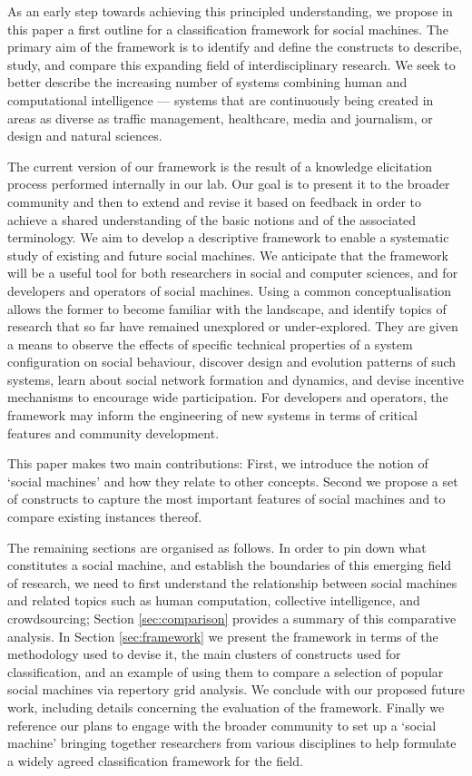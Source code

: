 \documentclass{www13-companion-accepted}
\begin{document}
As an early step towards achieving this principled understanding, we propose in this paper a first outline for a classification framework for social machines. The primary aim of the framework is to identify and define the constructs to describe, study, and compare this expanding field of interdisciplinary research. We seek to better describe the increasing number of systems combining human and computational intelligence --- systems that are continuously being created in areas as diverse as traffic management, healthcare, media and journalism, or design and natural sciences.

The current version of our framework is the result of a knowledge elicitation process performed internally in our lab. Our goal is to present it to the broader community and then to extend and revise it based on feedback in order to achieve a shared understanding of the basic notions and of the associated terminology. We aim to develop a descriptive framework to enable a systematic study of existing and future social machines. We anticipate that the framework will be a useful tool for both researchers in social and computer sciences, and for developers and operators of social machines. Using a common conceptualisation allows the former to become familiar with the landscape, and identify topics of research that so far have remained unexplored or under-explored. They are given a means to observe the effects of specific technical properties of a system configuration on social behaviour, discover design and evolution patterns of such systems, learn about social network formation and dynamics, and devise incentive mechanisms to encourage wide participation. For developers and operators, the framework may inform the engineering of new systems in terms of critical features and community development.

This paper makes two main contributions: First, we introduce the notion of `social machines' and how they relate to other concepts. Second we propose a set of constructs to capture the most important features of social machines and to compare existing instances thereof.

The remaining sections are organised as follows. In order to pin down what constitutes a social machine, and establish the boundaries of this emerging field of research, we need to first understand the relationship between social machines and related topics such as human computation, collective intelligence, and crowdsourcing; Section \ref{sec:comparison} provides a summary of this comparative analysis. In Section \ref{sec:framework} we present the framework in terms of the methodology used to devise it, the main clusters of constructs used for classification, and an example of using them to compare a selection of popular social machines via repertory grid analysis. We conclude with our proposed future work, including details concerning the evaluation of the framework. Finally we reference our plans to engage with the broader community to set up a `social machine' bringing together researchers from various disciplines to help formulate a widely agreed classification framework for the field.
\end{document}
